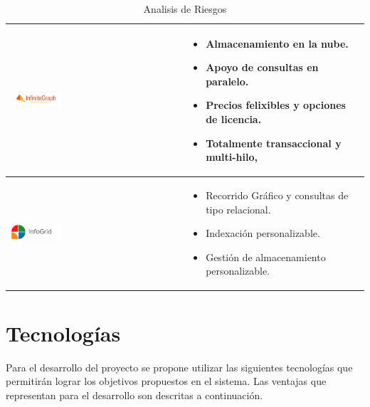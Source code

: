 \begin{table}[b!]
\begin{tabular}{|p{2cm}|ll}
        \hline
          \multicolumn{1}{|p{5cm}|}{\includegraphics[width=0.3\textwidth]{images/InfiniteGraph}} & 
          \multicolumn{1}{p{10cm}|}{
          \begin{itemize}
        \item Almacenamiento en la nube.
        \item Apoyo de consultas en paralelo.
        \item Precios felixibles y opciones de licencia.
        \item Totalmente transaccional y multi-hilo,
      \end{itemize}} \\ 
        \hline
          \multicolumn{1}{|p{3cm}|}{\includegraphics[width=0.3\textwidth]{images/InfoGrid}} & 
          \multicolumn{1}{p{8cm}|}{
          \begin{itemize}
        \item Recorrido Gráfico y consultas de tipo relacional.
        \item Indexación personalizable.
        \item Gestión de almacenamiento personalizable.
      \end{itemize}}\\ 
         \hline
      \end{tabular}
      \caption{Analisis de Riesgos}
      \label{Analisis de riesgos}
    \end{table}
\newpage
\section{Tecnologías}
Para el desarrollo del proyecto se propone utilizar las siguientes tecnologías que permitirán lograr los objetivos propuestos en el sistema. Las ventajas que representan para el desarrollo son descritas a continuación.

